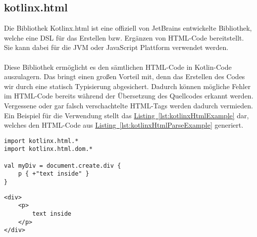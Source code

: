 \subsection{kotlinx.html}\label{sec:kotlinxHtml}
Die Bibliothek Kotlinx.html ist eine offiziell von JetBrains entwickelte Bibliothek, welche eine \gls{DSL} für das Erstellen bzw. Ergänzen von HTML-Code bereitstellt. Sie kann dabei für die \gls{JVM} oder JavaScript Plattform verwendet werden.\\
\\
Diese Bibliothek ermöglicht es den sämtlichen HTML-Code in Kotlin-Code auszulagern. Das bringt einen großen Vorteil mit, denn das Erstellen des Codes wir durch eine statisch Typisierung abgesichert. Dadurch können mögliche Fehler im HTML-Code bereits während der Übersetzung des Quellcodes erkannt werden. Vergessene oder gar falsch verschachtelte HTML-Tags werden dadurch vermieden. Ein Beispiel für die Verwendung stellt das \hyperref[lst:kotlinxHtmlExample]{Listing~\ref{lst:kotlinxHtmlExample}} dar, welches den HTML-Code aus \hyperref[lst:kotlinxHtmlParseExample]{Listing~\ref{lst:kotlinxHtmlParseExample}} generiert.
\begin{lstlisting}[style=lstStyleFramed, caption={Beispiel: Verwendung der Bibliothek kontlinx.html \cite{kotlinxExample}}, label=lst:kotlinxHtmlExample]
import kotlinx.html.*
import kotlinx.html.dom.*

val myDiv = document.create.div {
	p { +"text inside" }
}
\end{lstlisting}
\begin{lstlisting}[style=lstStyleFramed, caption={Beispiel: Verwendung der Bibliothek kotlinx.html (Ergebnis)}, label=lst:kotlinxHtmlParseExample]
<div>
	<p>
		text inside
	</p>
</div>
\end{lstlisting}

